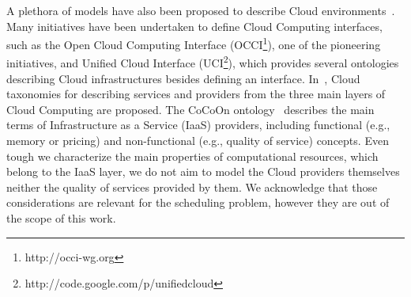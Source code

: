 A plethora of models have also been proposed to describe Cloud 
environments~\cite{Youseff2008}. Many initiatives have been undertaken to 
define Cloud Computing interfaces, such as the Open Cloud Computing 
Interface (OCCI\footnote{http://occi-wg.org}), one of the pioneering initiatives, 
and Unified Cloud Interface (UCI\footnote{http://code.google.com/p/unifiedcloud}), 
which provides several ontologies describing Cloud infrastructures besides defining 
an interface. In~\cite{Hoefer2010}, Cloud taxonomies for describing services and 
providers from the three main layers of Cloud Computing are proposed. The 
CoCoOn ontology~\cite{zhang2012ontology} describes the main terms of 
Infrastructure as a Service (IaaS) providers, including functional (e.g., memory 
or pricing) and non-functional (e.g., quality of service) concepts. Even tough
we characterize the main properties of computational resources, which belong 
to the IaaS layer, we do not aim to model the Cloud providers themselves neither 
the quality of services provided by them. We acknowledge that those considerations 
are relevant for the scheduling problem, however they are out of the scope of 
this work.
















